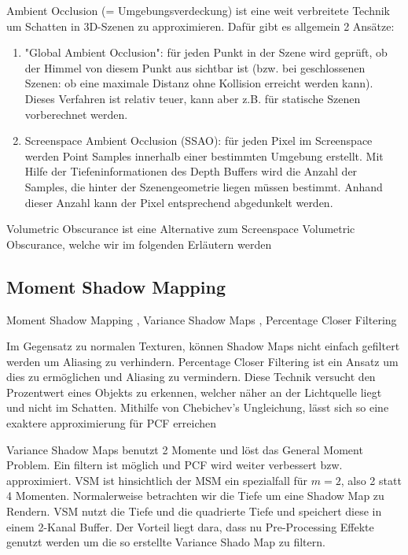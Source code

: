 \documentclass[runningheaders,a4paper]{llncs}
\begin{document}
Ambient Occlusion (= Umgebungsverdeckung) ist eine weit verbreitete Technik um Schatten in 3D-Szenen
zu approximieren. Dafür gibt es allgemein 2 Ansätze:
\begin{enumerate}
	\item "Global Ambient Occlusion": für jeden Punkt in der Szene wird geprüft, ob der Himmel von diesem
		Punkt aus sichtbar ist (bzw. bei geschlossenen Szenen: ob eine maximale Distanz ohne Kollision erreicht
		 werden kann). Dieses Verfahren ist relativ teuer, kann aber z.B. für statische Szenen vorberechnet
		 werden.
		\cite{aoPaper}
	\item Screenspace Ambient Occlusion (SSAO): für jeden Pixel im Screenspace werden Point Samples
		innerhalb einer bestimmten Umgebung erstellt. Mit Hilfe der Tiefeninformationen des Depth Buffers
		wird die Anzahl der Samples, die hinter der Szenengeometrie liegen müssen bestimmt. Anhand dieser Anzahl
		kann der Pixel entsprechend abgedunkelt werden.  \cite{cry2Paper}
\end{enumerate}  
Volumetric Obscurance ist eine Alternative zum Screenspace Volumetric Obscurance, welche wir im folgenden
Erläutern werden

\cite{loos2010volumetric}

\subsection{Moment Shadow Mapping}

Moment Shadow Mapping \cite{msm}, Variance Shadow Maps \cite{donnelly2006variance}, Percentage Closer Filtering \cite{reeves1987rendering}

Im Gegensatz zu normalen Texturen, können Shadow Maps nicht einfach gefiltert werden um Aliasing zu verhindern. Percentage Closer Filtering ist ein Ansatz um dies zu ermöglichen und Aliasing zu vermindern. Diese Technik versucht den Prozentwert eines Objekts zu erkennen, welcher näher an der Lichtquelle liegt und nicht im Schatten. Mithilfe von Chebichev's Ungleichung, lässt sich so eine exaktere approximierung für PCF erreichen \cite{vsm}

Variance Shadow Maps benutzt 2 Momente und löst das General Moment Problem. Ein filtern ist  möglich und PCF wird weiter verbessert bzw. approximiert. VSM ist hinsichtlich der MSM ein spezialfall für $m = 2$, also 2 statt 4 Momenten. Normalerweise betrachten wir die Tiefe um eine Shadow Map zu Rendern. VSM nutzt die Tiefe und die quadrierte Tiefe und speichert diese in einem 2-Kanal Buffer. Der Vorteil liegt dara, dass nu Pre-Processing Effekte genutzt werden um die so erstellte Variance Shado Map zu filtern.\cite{donnelly2006variance}
\end{document}
